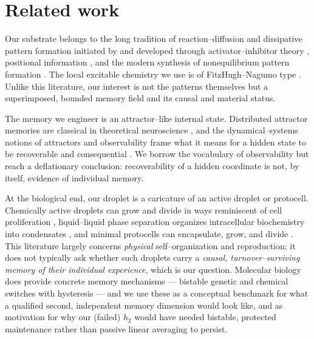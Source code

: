 \documentclass[11pt]{article}
\begin{document}
\section{Related work}
Our substrate belongs to the long tradition of reaction--diffusion and dissipative pattern formation initiated by
\citet{turing1952} and developed through activator--inhibitor theory \citep{gierer1972}, positional information
\citep{wolpert1969}, and the modern synthesis of nonequilibrium pattern formation \citep{cross1993,kondo2010,nicolis1977}.
The local excitable chemistry we use is of FitzHugh--Nagumo type \citep{fitzhugh1961,nagumo1962}. Unlike this
literature, our interest is not the patterns themselves but a superimposed, bounded memory field and its causal and
material status.

The memory we engineer is an attractor--like internal state. Distributed attractor memories are classical in
theoretical neuroscience \citep{hopfield1982}, and the dynamical--systems notions of attractors and observability
frame what it means for a hidden state to be recoverable and consequential \citep{strogatz1994,hermann1977}. We
borrow the vocabulary of observability but reach a deflationary conclusion: recoverability of a hidden coordinate
is not, by itself, evidence of individual memory.

At the biological end, our droplet is a caricature of an active droplet or protocell. Chemically active droplets can
grow and divide in ways reminiscent of cell proliferation \citep{zwicker2017}, liquid--liquid phase separation
organizes intracellular biochemistry into condensates \citep{brangwynne2009,hyman2014,banani2017}, and minimal
protocells can encapsulate, grow, and divide \citep{szostak2001,hanczyc2003}. This literature largely concerns
\emph{physical} self--organization and reproduction; it does not typically ask whether such droplets carry a
\emph{causal, turnover--surviving memory of their individual experience}, which is our question. Molecular biology
does provide concrete memory mechanisms --- bistable genetic and chemical switches with hysteresis
\citep{gardner2000,elowitz2000,ferrell2002,ptashne2004} --- and we use these as a conceptual benchmark for what a
qualified second, independent memory dimension would look like, and as motivation for why our (failed) $h_2$ would
have needed bistable, protected maintenance rather than passive linear averaging to persist.
\end{document}

